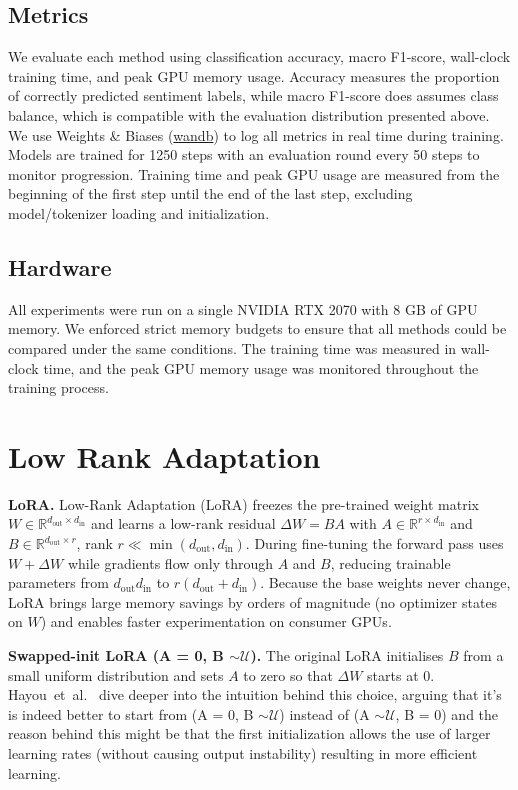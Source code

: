 \documentclass[a4paper,10pt,twocolumn,english]{article}
\begin{document}
\subsection{Metrics}
We evaluate each method using classification accuracy, macro F1-score, wall-clock training time, and peak GPU memory usage. Accuracy measures the proportion of correctly predicted sentiment labels, while macro F1-score does assumes class balance, which is compatible with the evaluation distribution presented above. We use Weights \& Biases (\href{https://wandb.ai/site/}{wandb}) to log all metrics in real time during training. Models are trained for 1250 steps with an evaluation round every 50 steps to monitor progression. Training time and peak GPU usage are measured from the beginning of the first step until the end of the last step, excluding model/tokenizer loading and initialization.


\subsection{Hardware} All experiments were run on a single NVIDIA RTX 2070 with 8 GB of GPU memory. We enforced strict memory budgets to ensure that all methods could be compared under the same conditions. The training time was measured in wall-clock time, and the peak GPU memory usage was monitored throughout the training process.

\section{Low Rank Adaptation}

\noindent\textbf{LoRA.}  Low-Rank Adaptation (LoRA) \cite{hu2021loralowrankadaptationlarge} freezes the pre-trained weight matrix $W\!\in\!\mathbb{R}^{d_{\text{out}}\times d_{\text{in}}}$ and learns a low-rank residual $\Delta W = B A$ with $A\!\in\!\mathbb{R}^{r \times d_{\text{in}}}$ and $B\!\in\!\mathbb{R} ^ {d_{\text{out}} \times r}$, rank $r\!\ll\!\min(d_{\text{out}},d_{\text{in}})$.  During fine-tuning the forward pass uses $W+\Delta W$ while gradients flow only through $A$ and $B$, reducing trainable parameters from $d_{\text{out}}d_{\text{in}}$ to $r(d_{\text{out}}+d_{\text{in}})$.  Because the base weights never change, LoRA brings large memory savings by orders of magnitude (no optimizer states on $W$) and enables faster experimentation on consumer GPUs.

\noindent\textbf{Swapped-init LoRA (A = 0, B $\sim\mathcal{U}$).}  The original LoRA initialises $B$ from a small uniform distribution and sets $A$ to zero so that $\Delta W$ starts at 0.  Hayou~et~al.\ \cite{hayou2024impactinitializationlorafinetuning} dive deeper into the intuition behind this choice, arguing that it's is indeed better to start from (A = 0, B $\sim\mathcal{U}$) instead of (A $\sim\mathcal{U}$, B = 0) and the reason behind this might be that the first initialization allows the use of larger learning rates (without causing output instability) resulting in more efficient learning.
\end{document}
